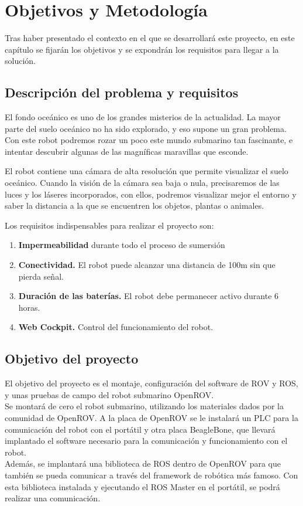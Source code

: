 \chapter{Objetivos y Metodología}
\label{cap:objetivos}
Tras haber presentado el contexto en el que se desarrollará este proyecto, en este capítulo se fijarán los objetivos y se expondrán los requisitos para llegar a la solución.
\section{Descripción del problema y requisitos}
\label{sec:descripciondelproblema}

El fondo oceánico es uno de los grandes misterios de la actualidad. La mayor parte del suelo oceánico no ha sido explorado, y eso supone un gran problema. Con este robot podremos rozar un poco este mundo submarino tan fascinante, e intentar descubrir algunas de las magníficas maravillas que esconde.

El robot contiene una cámara de alta resolución que permite visualizar el suelo oceánico. Cuando la visión de la cámara sea baja o nula, precisaremos de las luces y los láseres incorporados, con ellos, podremos visualizar mejor el entorno y saber la distancia a la que se encuentren los objetos, plantas o animales. 

Los requisitos indispensables para realizar el proyecto son:
\begin{enumerate}
\item \textbf{Impermeabilidad} durante todo el proceso de sumersión
\item \textbf{Conectividad.} El robot puede alcanzar una distancia de 100m sin que pierda señal.
\item \textbf{Duración de las baterías.} El robot debe permanecer activo durante 6 horas. 
\item \textbf{Web Cockpit.} Control del funcionamiento del robot.
\end{enumerate}

\section{Objetivo del proyecto}
\label{sec:objetivos}

El objetivo del proyecto es el montaje, configuración del software de ROV y ROS, y unas pruebas de campo del robot submarino OpenROV. 
\\Se montará de cero el robot submarino, utilizando los materiales dados por la comunidad de OpenROV. A la placa de OpenROV se le instalará un PLC para la comunicación del robot con el portátil y otra placa BeagleBone, que llevará implantado el software necesario para la comunicación y funcionamiento con el robot.
\\Además, se implantará una biblioteca de ROS dentro de OpenROV para que también se pueda comunicar a través del framework de robótica más famoso. Con esta biblioteca instalada y ejecutando el ROS Master en el portátil, se podrá realizar una comunicación.

